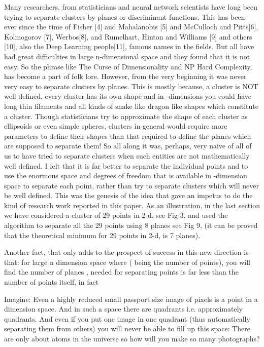 \documentclass[english]{article}
\begin{document}
Many researchers, from statisticians and neural network scientists
have long been trying to separate clusters by planes or discriminant
functions. This has been ever since the time of Fisher {[}4{]} and
Mahalanobis {[}5{]} and McCulloch and Pitts{[}6{]}, Kolmogorov {[}7{]},
Werbos{[}8{]}, and Rumelhart, Hinton and Williams {[}9{]} and others
{[}10{]}, also the Deep Learning people{[}11{]}, famous names in the
fields. But all have had great difficulties in large n-dimensional
space and they found that it is not easy. So the phrase like \textquotedbl{}The
Curse of Dimensionality\textquotedbl{} and \textquotedbl{}NP Hard
Complexity\textquotedbl{}, has become a part of folk lore. However,
from the very beginning it was never very easy to separate clusters
by planes. This is mostly because, a cluster is NOT well defined,
every cluster has its own shape and in -dimensions you could have
long thin filaments and all kinds of snake like dragon like shapes
which constitute a cluster. Though statisticians try to approximate
the shape of each cluster as ellipsoids or even simple spheres, clusters
in general would require more parameters to define their shapes than
that required to define the planes which are supposed to separate
them! So all along it was, perhaps, very naive of all of us to have
tried to separate clusters when such entities are not mathematically
well defined. I felt that it is far better to separate the individual
points and to use the enormous space and degrees of freedom that is
available in -dimension space to separate each point, rather than
try to separate clusters which will never be well defined. This was
the genesis of the idea that gave an impetus to do the kind of research
work reported in this paper. As an illustration, in the last section
we have considered a cluster of 29 points in 2-d, see Fig 3, 
and used the algorithm to separate all the 29 points using 8 planes
see Fig 9, (it can be proved that the theoretical minimum for
29 points in 2-d, is 7 planes).

Another fact, that only adds to the prospect of success in this new
direction is that: for large n dimension space where  (
being the number of points), you will find the number of planes ,
needed for separating  points is far less than the number of points
itself, in fact 

Imagine: Even a highly reduced small passport size image of 
pixels is a point in a  dimension space. And in such a space
there are  quadrants i.e. approximately  quadrants.
And even if you put one image in one quadrant (thus automatically
separating them from others) you will never be able to fill up this
space: There are only about  atoms in the universe so how
will you make so many photographs?
\end{document}

